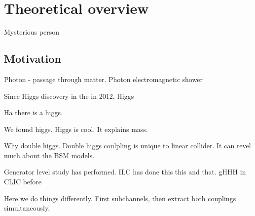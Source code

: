 \chapter{Theoretical overview}
\label{chap:Theory}

%
{Mysterious person}%

\section{Motivation}



Photon - passage through matter. Photon electromagnetic shower


Since Higgs discovery in the \LHC in 2012, Higgs



Ha there is a higgs.

We found higgs. Higgs is cool. It explains mass.

Why double higgs. Double higgs coulpling is unique to linear collider. It can revel much about the BSM models.

Generator level study has performed. ILC has done this this and that. gHHH in CLIC before

Here we do things differently. First subchannels, then extract both couplings simultaneously.


